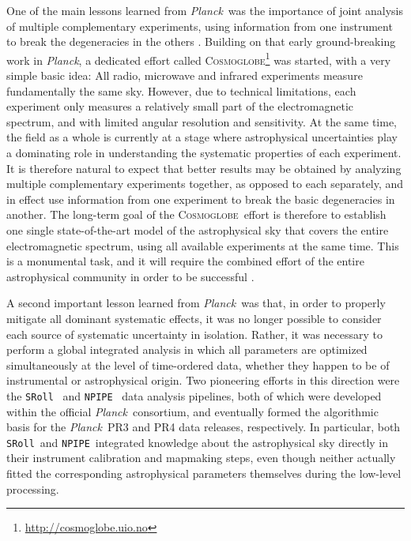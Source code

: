 \documentclass{aa}
\def\Cosmoglobe{\textsc{Cosmoglobe}}
\def\Planck{\textit{Planck}}
\newcommand{\npipe}[0]{\texttt{NPIPE}}
\newcommand{\sroll}[0]{\texttt{SRoll}}
\begin{document}
One of the main lessons learned from \Planck\ was the importance of joint analysis of multiple complementary experiments, using information from one instrument to break the degeneracies in the others \citep[e.g.,][]{planck2014-a12}. Building on that early ground-breaking work in \Planck, a dedicated effort called \Cosmoglobe\footnote{\url{http://cosmoglobe.uio.no}} was started, with a very simple basic idea: All radio, microwave and infrared experiments measure fundamentally the same sky. However, due to technical limitations, each experiment only measures a relatively small part of the electromagnetic spectrum, and with limited angular resolution and sensitivity. At the same time, the field as a whole is currently at a stage where astrophysical uncertainties play a dominating role in understanding the systematic properties of each experiment. It is therefore natural to expect that better results may be obtained by analyzing multiple complementary experiments together, as opposed to each separately, and in effect use information from one experiment to break the basic degeneracies in another. The long-term goal of the \Cosmoglobe\ effort is therefore to establish one single state-of-the-art model of the astrophysical sky that covers the entire electromagnetic spectrum, using all available experiments at the same time. This is a monumental task, and it will require the combined effort of the entire astrophysical community in order to be successful \citep{bp05}. 

A second important lesson learned from \Planck\ was that, in order to properly mitigate all dominant systematic effects, it was no longer possible to consider each source of systematic uncertainty in isolation. Rather, it was necessary to perform a global integrated analysis in which all parameters are optimized simultaneously at the level of time-ordered data, whether they happen to be of instrumental or astrophysical origin. Two pioneering efforts in this direction were the \sroll\ \citep{sroll2} and \npipe\ \citep{npipe} data analysis pipelines, both of which were developed within the official \Planck\ consortium, and eventually formed the algorithmic basis for the \Planck\ PR3 \citep{planck2016-l01} and PR4 \citep{npipe} data releases, respectively. In particular, both \sroll\ and \npipe\ integrated knowledge about the astrophysical sky directly in their instrument calibration and mapmaking steps, even though neither actually fitted the corresponding astrophysical parameters themselves  during the low-level processing.
\end{document}
